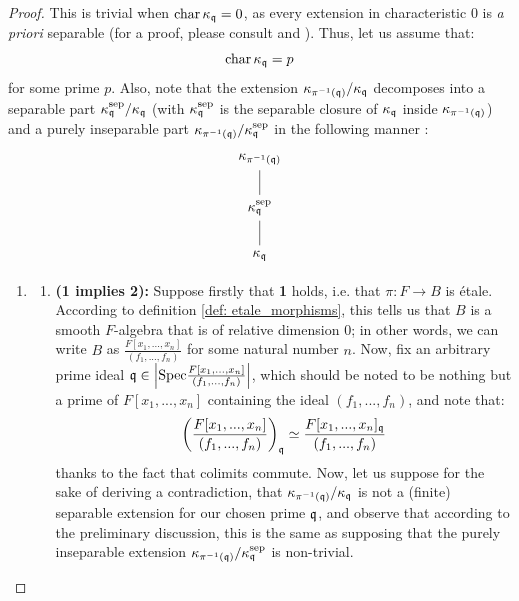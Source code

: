                 \begin{proof}
                    This is trivial when $\operatorname{char} \kappa_{\mathfrak{q}} = 0$, as every extension in characteristic $0$ is \textit{a priori} separable (for a proof, please consult \cite[\href{https://stacks.math.columbia.edu/tag/030Q}{Tag 030Q}]{stacks} and \cite[\href{https://stacks.math.columbia.edu/tag/030N}{Tag 030N}]{stacks}). Thus, let us assume that:
                        $$\operatorname{char} \kappa_{\mathfrak{q}} = p$$
                    for some prime $p$. Also, note that the extension $\kappa_{\pi^{-1}(\mathfrak{q})}/\kappa_{\mathfrak{q}}$ decomposes into a separable part $\kappa_{\mathfrak{q}}^{\mathrm{sep}}/\kappa_{\mathfrak{q}}$ (with $\kappa_{\mathfrak{q}}^{\mathrm{sep}}$ is the separable closure of $\kappa_{\mathfrak{q}}$ inside $\kappa_{\pi^{-1}(\mathfrak{q})}$) and a purely inseparable part $\kappa_{\pi^{-1}(\mathfrak{q})}/\kappa_{\mathfrak{q}}^{\mathrm{sep}}$ in the following manner \cite[\href{https://stacks.math.columbia.edu/tag/030K}{Tag 030K}]{stacks}:
                        $$
                            \begin{tikzcd}
                            	{\kappa_{\pi^{-1}(\q)}} \\
                            	{\kappa_{\q}^{\sep}} \\
                            	{\kappa_{\q}}
                            	\arrow[no head, from=3-1, to=2-1]
                            	\arrow[no head, from=2-1, to=1-1]
                            \end{tikzcd}
                        $$
                    \begin{enumerate}
                        \item 
                            \begin{enumerate}
                                \item \textbf{(1 implies 2):} Suppose firstly that \textbf{1} holds, i.e. that $\pi: F \to B$ is \'etale. According to definition \ref{def: etale_morphisms}, this tells us that $B$ is a smooth $F$-algebra that is of relative dimension $0$; in other words, we can write $B$ as $\frac{F[x_1, ..., x_n]}{(f_1, ..., f_n)}$ for some natural number $n$. Now, fix an arbitrary prime ideal $\mathfrak{q} \in \left|\mathrm{Spec} \frac{F[x_1, ..., x_n]}{(f_1, ..., f_n)}\right|$, which should be noted to be nothing but a prime of $F[x_1, ..., x_n]$ containing the ideal $(f_1, ..., f_n)$, and note that:
                                    $$\left(\frac{F[x_1, ..., x_n]}{(f_1, ..., f_n)}\right)_{\mathfrak{q}} \simeq \frac{F[x_1, ..., x_n]_{\mathfrak{q}}}{(f_1, ..., f_n)}$$
                                thanks to the fact that colimits commute. Now, let us suppose for the sake of deriving a contradiction, that $\kappa_{\pi^{-1}(\mathfrak{q})}/\kappa_{\mathfrak{q}}$ is not a (finite) separable extension for our chosen prime $\mathfrak{q}$, and observe that according to the preliminary discussion, this is the same as supposing that the purely inseparable extension $\kappa_{\pi^{-1}(\mathfrak{q})}/\kappa_{\mathfrak{q}}^{\mathrm{sep}}$ is non-trivial. 

\end{enumerate}
\end{enumerate}
\end{proof}
